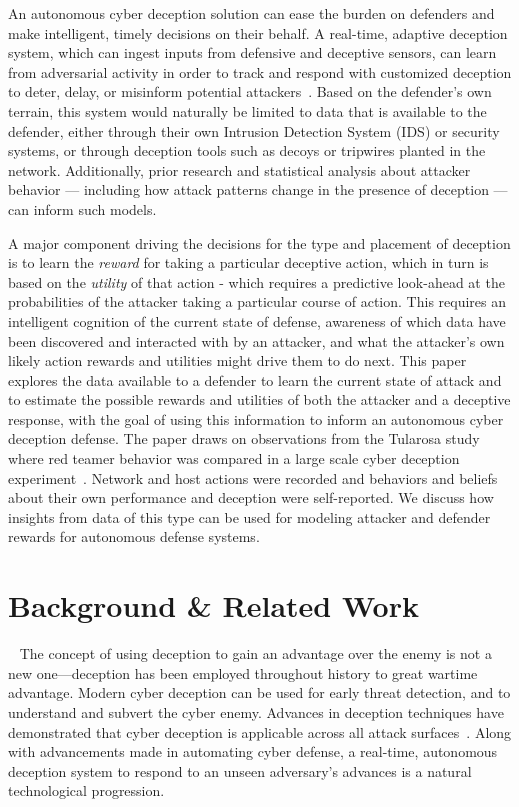 \documentclass{article}
\begin{document}
An autonomous cyber deception solution can ease the burden on defenders and make intelligent, timely decisions on their behalf. A real-time, adaptive deception system, which can ingest inputs from defensive and deceptive sensors, can learn from adversarial activity in order to track and respond with customized deception to deter, delay, or misinform potential attackers~\cite{fugate2019}. Based on the defender's own terrain, this system would naturally be limited to data that is available to the defender, either through their own Intrusion Detection System (IDS) or security systems, or through deception tools such as decoys or tripwires planted in the network. Additionally, prior research and statistical analysis about attacker behavior --- including how attack patterns change in the presence of deception --- can inform such models. 

A major component driving the decisions for the type and placement of deception is to learn the \textit{reward} for taking a particular deceptive action, which in turn is based on the \textit{utility} of that action - which requires a predictive look-ahead at the probabilities of the attacker taking a particular course of action. This requires an intelligent cognition of the current state of defense, awareness of which data have been discovered and interacted with by an attacker, and what the attacker's own likely action rewards and utilities might drive them to do next. 
This paper explores the data available to a defender to learn the current state of attack and to estimate the possible rewards and utilities of both the attacker and a deceptive response, with the goal of using this information to inform an autonomous cyber deception defense. The paper draws on observations from the Tularosa study where red teamer behavior was compared in a large scale cyber deception experiment~\cite{tularosa2019}. Network and host actions were recorded and behaviors and beliefs about their own performance and deception were self-reported. We discuss how insights from data of this type can be used for modeling attacker and defender rewards for autonomous defense systems.


\section{Background \& Related Work}~\label{sec:related_work}
The concept of using deception to gain an advantage over the enemy is not a new one---deception has been employed throughout history to great wartime advantage. Modern cyber deception can be used for early threat detection, and to understand and subvert the cyber enemy. Advances in deception techniques have demonstrated that cyber deception is applicable across all attack surfaces~\cite{dickinson2020}. Along with advancements made in automating cyber defense, a real-time, autonomous deception system to respond to an unseen adversary's advances is a natural technological progression. 
\end{document}
